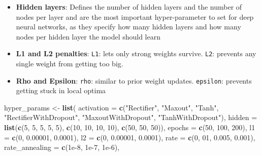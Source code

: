 \documentclass[]{article}
\newenvironment{Shaded}{\begin{snugshade}}{\end{snugshade}}
\newcommand{\KeywordTok}[1]{\textcolor[rgb]{0.13,0.29,0.53}{\textbf{{#1}}}}
\newcommand{\DataTypeTok}[1]{\textcolor[rgb]{0.13,0.29,0.53}{{#1}}}
\newcommand{\DecValTok}[1]{\textcolor[rgb]{0.00,0.00,0.81}{{#1}}}
\newcommand{\FloatTok}[1]{\textcolor[rgb]{0.00,0.00,0.81}{{#1}}}
\newcommand{\StringTok}[1]{\textcolor[rgb]{0.31,0.60,0.02}{{#1}}}
\newcommand{\NormalTok}[1]{{#1}}
\begin{document}
\begin{itemize}
\item
  \textbf{Hidden layers}: Defines the number of hidden layers and the
  number of nodes per layer and are the most important hyper-parameter
  to set for deep neural networks, as they specify how many hidden
  layers and how many nodes per hidden layer the model should learn
\item
  \textbf{L1 and L2 penalties}: \texttt{L1}: lets only strong weights
  survive. \texttt{L2}: prevents any single weight from getting too big.
\item
  \textbf{Rho and Epsilon}: \texttt{rho}: similar to prior weight
  updates. \texttt{epsilon}: prevents getting stuck in local optima
\end{itemize}

\begin{Shaded}
\begin{Highlighting}[]
\NormalTok{hyper_params <-}\StringTok{ }\KeywordTok{list}\NormalTok{(}
                     \DataTypeTok{activation =} \KeywordTok{c}\NormalTok{(}\StringTok{"Rectifier"}\NormalTok{, }\StringTok{"Maxout"}\NormalTok{, }\StringTok{"Tanh"}\NormalTok{, }\StringTok{"RectifierWithDropout"}\NormalTok{, }
                                    \StringTok{"MaxoutWithDropout"}\NormalTok{, }\StringTok{"TanhWithDropout"}\NormalTok{), }
                     \DataTypeTok{hidden =} \KeywordTok{list}\NormalTok{(}\KeywordTok{c}\NormalTok{(}\DecValTok{5}\NormalTok{, }\DecValTok{5}\NormalTok{, }\DecValTok{5}\NormalTok{, }\DecValTok{5}\NormalTok{, }\DecValTok{5}\NormalTok{), }\KeywordTok{c}\NormalTok{(}\DecValTok{10}\NormalTok{, }\DecValTok{10}\NormalTok{, }\DecValTok{10}\NormalTok{, }\DecValTok{10}\NormalTok{), }\KeywordTok{c}\NormalTok{(}\DecValTok{50}\NormalTok{, }\DecValTok{50}\NormalTok{, }\DecValTok{50}\NormalTok{)),}
                     \DataTypeTok{epochs =} \KeywordTok{c}\NormalTok{(}\DecValTok{50}\NormalTok{, }\DecValTok{100}\NormalTok{, }\DecValTok{200}\NormalTok{),}
                     \DataTypeTok{l1 =} \KeywordTok{c}\NormalTok{(}\DecValTok{0}\NormalTok{, }\FloatTok{0.00001}\NormalTok{, }\FloatTok{0.0001}\NormalTok{), }
                     \DataTypeTok{l2 =} \KeywordTok{c}\NormalTok{(}\DecValTok{0}\NormalTok{, }\FloatTok{0.00001}\NormalTok{, }\FloatTok{0.0001}\NormalTok{),}
                     \DataTypeTok{rate =} \KeywordTok{c}\NormalTok{(}\DecValTok{0}\NormalTok{, }\DecValTok{01}\NormalTok{, }\FloatTok{0.005}\NormalTok{, }\FloatTok{0.001}\NormalTok{),}
                     \DataTypeTok{rate_annealing =} \KeywordTok{c}\NormalTok{(}\FloatTok{1e-8}\NormalTok{, }\FloatTok{1e-7}\NormalTok{, }\FloatTok{1e-6}\NormalTok{),}

\end{Highlighting}
\end{Shaded}
\end{document}
